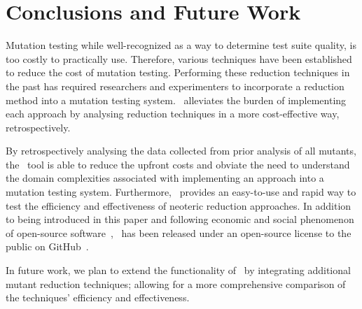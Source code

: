 \section{Conclusions and Future Work}

Mutation testing while well-recognized as a way to determine test suite quality, is too costly
to practically use. Therefore, various techniques have been established to reduce the cost
of mutation testing. Performing these reduction techniques in the past has required researchers
and experimenters to incorporate a reduction method into a mutation testing system. \mr~alleviates
the burden of implementing each approach by analysing reduction techniques in a more cost-effective
way, retrospectively.

By retrospectively analysing the data collected from prior analysis of all
mutants, the \mr~tool is able to reduce the upfront costs and obviate the need to understand the
domain complexities associated with implementing an approach into a mutation testing system.
Furthermore, \mr~provides an easy-to-use and rapid way to test the efficiency and effectiveness of
neoteric reduction approaches. In addition to being introduced in this paper and following economic
and social phenomenon of open-source software~\cite{hippel2003open}, \mr~has been released under an
open-source license to the public on GitHub~\cite{github}.

In future work, we plan to extend the functionality of \mr~by integrating additional
mutant reduction techniques; allowing for a more comprehensive comparison of the techniques'
efficiency and effectiveness.

